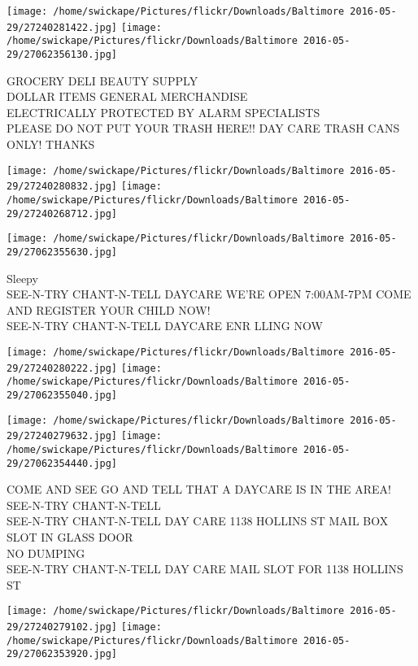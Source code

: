 \documentclass[10pt,letterpaper]{article}
\begin{document}
\texttt{[image: /home/swickape/Pictures/flickr/Downloads/Baltimore 2016-05-29/27240281422.jpg]}
\texttt{[image: /home/swickape/Pictures/flickr/Downloads/Baltimore 2016-05-29/27062356130.jpg]}

GROCERY DELI BEAUTY SUPPLY\\
DOLLAR ITEMS GENERAL MERCHANDISE\\
ELECTRICALLY PROTECTED BY ALARM SPECIALISTS\\
PLEASE DO NOT PUT YOUR TRASH HERE!! DAY CARE TRASH CANS ONLY!  THANKS
\pagebreak

\texttt{[image: /home/swickape/Pictures/flickr/Downloads/Baltimore 2016-05-29/27240280832.jpg]}
\texttt{[image: /home/swickape/Pictures/flickr/Downloads/Baltimore 2016-05-29/27240268712.jpg]}

\vspace{0.25in}
\texttt{[image: /home/swickape/Pictures/flickr/Downloads/Baltimore 2016-05-29/27062355630.jpg]}

Sleepy\\
SEE{-}N{-}TRY CHANT{-}N{-}TELL DAYCARE WE'RE OPEN 7:00AM{-}7PM COME AND REGISTER YOUR CHILD NOW!\\
SEE{-}N{-}TRY CHANT{-}N{-}TELL DAYCARE ENR LLING NOW
\pagebreak

\texttt{[image: /home/swickape/Pictures/flickr/Downloads/Baltimore 2016-05-29/27240280222.jpg]}
\texttt{[image: /home/swickape/Pictures/flickr/Downloads/Baltimore 2016-05-29/27062355040.jpg]}

\texttt{[image: /home/swickape/Pictures/flickr/Downloads/Baltimore 2016-05-29/27240279632.jpg]}
\texttt{[image: /home/swickape/Pictures/flickr/Downloads/Baltimore 2016-05-29/27062354440.jpg]}

COME AND SEE GO AND TELL THAT A DAYCARE IS IN THE AREA!  SEE{-}N{-}TRY CHANT{-}N{-}TELL\\
SEE{-}N{-}TRY CHANT{-}N{-}TELL DAY CARE 1138 HOLLINS ST MAIL BOX SLOT IN GLASS DOOR\\
NO DUMPING\\
SEE{-}N{-}TRY CHANT{-}N{-}TELL DAY CARE MAIL SLOT FOR 1138 HOLLINS ST
\pagebreak

\texttt{[image: /home/swickape/Pictures/flickr/Downloads/Baltimore 2016-05-29/27240279102.jpg]}
\texttt{[image: /home/swickape/Pictures/flickr/Downloads/Baltimore 2016-05-29/27062353920.jpg]}
\end{document}
